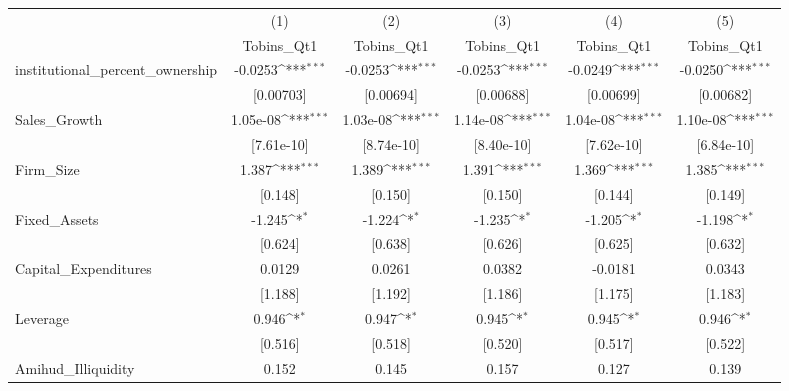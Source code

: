 {
\def\sym#1{\ifmmode^{#1}\else\(^{#1}\)\fi}
\begin{tabular}{l*{5}{c}}
\hline\hline
            &\multicolumn{1}{c}{(1)}&\multicolumn{1}{c}{(2)}&\multicolumn{1}{c}{(3)}&\multicolumn{1}{c}{(4)}&\multicolumn{1}{c}{(5)}\\
            &\multicolumn{1}{c}{Tobins\_Qt1}&\multicolumn{1}{c}{Tobins\_Qt1}&\multicolumn{1}{c}{Tobins\_Qt1}&\multicolumn{1}{c}{Tobins\_Qt1}&\multicolumn{1}{c}{Tobins\_Qt1}\\
\hline
institutional\_percent\_ownership&     -0.0253\sym{***}&     -0.0253\sym{***}&     -0.0253\sym{***}&     -0.0249\sym{***}&     -0.0250\sym{***}\\
            &   [0.00703]         &   [0.00694]         &   [0.00688]         &   [0.00699]         &   [0.00682]         \\
[1em]
Sales\_Growth&    1.05e-08\sym{***}&    1.03e-08\sym{***}&    1.14e-08\sym{***}&    1.04e-08\sym{***}&    1.10e-08\sym{***}\\
            &  [7.61e-10]         &  [8.74e-10]         &  [8.40e-10]         &  [7.62e-10]         &  [6.84e-10]         \\
[1em]
Firm\_Size   &       1.387\sym{***}&       1.389\sym{***}&       1.391\sym{***}&       1.369\sym{***}&       1.385\sym{***}\\
            &     [0.148]         &     [0.150]         &     [0.150]         &     [0.144]         &     [0.149]         \\
[1em]
Fixed\_Assets&      -1.245\sym{*}  &      -1.224\sym{*}  &      -1.235\sym{*}  &      -1.205\sym{*}  &      -1.198\sym{*}  \\
            &     [0.624]         &     [0.638]         &     [0.626]         &     [0.625]         &     [0.632]         \\
[1em]
Capital\_Expenditures&      0.0129         &      0.0261         &      0.0382         &     -0.0181         &      0.0343         \\
            &     [1.188]         &     [1.192]         &     [1.186]         &     [1.175]         &     [1.183]         \\
[1em]
Leverage    &       0.946\sym{*}  &       0.947\sym{*}  &       0.945\sym{*}  &       0.945\sym{*}  &       0.946\sym{*}  \\
            &     [0.516]         &     [0.518]         &     [0.520]         &     [0.517]         &     [0.522]         \\
[1em]
Amihud\_Illiquidity&       0.152         &       0.145         &       0.157         &       0.127         &       0.139         \\

\end{tabular}}
